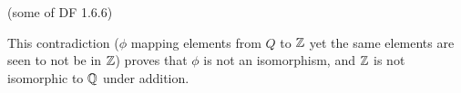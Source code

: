 \begin{problem}{\textsf{(some of DF 1.6.6)}}
\begin{enumalph}
\begin{Answer}
      \noindent
      This contradiction ($\phi$ mapping elements from $Q$ to $\mathbb{Z}$ yet the same elements are
      seen to not be in $\mathbb{Z}$) proves that $\phi$ is not an isomorphism, and $\mathbb{Z}$ is not isomorphic
      to $\mathbb{Q}$ under addition.
    \end{Answer}
  \end{enumalph}
\end{problem}

